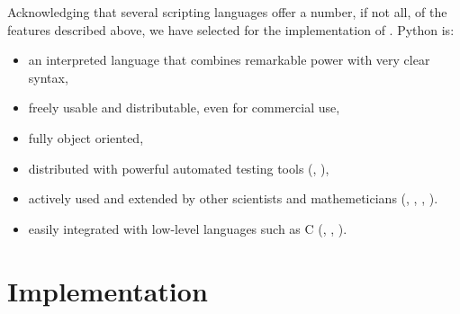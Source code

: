 Acknowledging that several scripting languages offer a number, if not
all, of the features described above, we have selected \Python{} for
the implementation of \FiPy{}.  Python is:
\begin{itemize}
    
    \item an interpreted language that combines remarkable power with very clear
    syntax,
    
    \item freely usable and distributable, even for commercial use,
    
    \item fully object oriented,
    
    \item distributed with powerful automated testing tools (\doctest{},
    \unittest{}),

    \item actively used and extended by other scientists and
    mathemeticians (\SciPy{}, \Numeric{}, \ScientificPython{}, \PySparse{}).
    
    \item easily integrated with low-level languages such as C
    (\weave{}, \blitz{}, \PyRex{}).
    
\end{itemize}

\section{Implementation}

